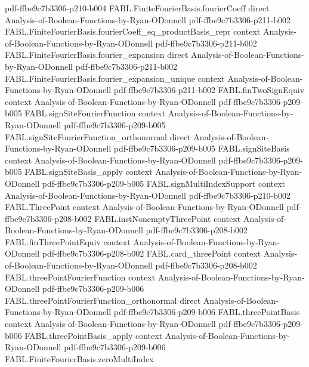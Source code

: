 \begin{theorem}
  {pdf-ffbe9c7b3306-p210-b004}
\proofstep
  {FABL.FiniteFourierBasis.fourierCoeff}
  {direct}
  {Analysis-of-Boolean-Functions-by-Ryan-ODonnell}
  {pdf-ffbe9c7b3306-p211-b002}
\proofstep
  {FABL.FiniteFourierBasis.fourierCoeff_eq_productBasis_repr}
  {context}
  {Analysis-of-Boolean-Functions-by-Ryan-ODonnell}
  {pdf-ffbe9c7b3306-p211-b002}
\proofstep
  {FABL.FiniteFourierBasis.fourier_expansion}
  {direct}
  {Analysis-of-Boolean-Functions-by-Ryan-ODonnell}
  {pdf-ffbe9c7b3306-p211-b002}
\proofstep
  {FABL.FiniteFourierBasis.fourier_expansion_unique}
  {context}
  {Analysis-of-Boolean-Functions-by-Ryan-ODonnell}
  {pdf-ffbe9c7b3306-p211-b002}
\proofstep
  {FABL.finTwoSignEquiv}
  {context}
  {Analysis-of-Boolean-Functions-by-Ryan-ODonnell}
  {pdf-ffbe9c7b3306-p209-b005}
\proofstep
  {FABL.signSiteFourierFunction}
  {context}
  {Analysis-of-Boolean-Functions-by-Ryan-ODonnell}
  {pdf-ffbe9c7b3306-p209-b005}
\proofstep
  {FABL.signSiteFourierFunction_orthonormal}
  {direct}
  {Analysis-of-Boolean-Functions-by-Ryan-ODonnell}
  {pdf-ffbe9c7b3306-p209-b005}
\proofstep
  {FABL.signSiteBasis}
  {context}
  {Analysis-of-Boolean-Functions-by-Ryan-ODonnell}
  {pdf-ffbe9c7b3306-p209-b005}
\proofstep
  {FABL.signSiteBasis_apply}
  {context}
  {Analysis-of-Boolean-Functions-by-Ryan-ODonnell}
  {pdf-ffbe9c7b3306-p209-b005}
\proofstep
  {FABL.signMultiIndexSupport}
  {context}
  {Analysis-of-Boolean-Functions-by-Ryan-ODonnell}
  {pdf-ffbe9c7b3306-p210-b002}
\proofstep
  {FABL.ThreePoint}
  {context}
  {Analysis-of-Boolean-Functions-by-Ryan-ODonnell}
  {pdf-ffbe9c7b3306-p208-b002}
\proofstep
  {FABL.instNonemptyThreePoint}
  {context}
  {Analysis-of-Boolean-Functions-by-Ryan-ODonnell}
  {pdf-ffbe9c7b3306-p208-b002}
\proofstep
  {FABL.finThreePointEquiv}
  {context}
  {Analysis-of-Boolean-Functions-by-Ryan-ODonnell}
  {pdf-ffbe9c7b3306-p208-b002}
\proofstep
  {FABL.card_threePoint}
  {context}
  {Analysis-of-Boolean-Functions-by-Ryan-ODonnell}
  {pdf-ffbe9c7b3306-p208-b002}
\proofstep
  {FABL.threePointFourierFunction}
  {context}
  {Analysis-of-Boolean-Functions-by-Ryan-ODonnell}
  {pdf-ffbe9c7b3306-p209-b006}
\proofstep
  {FABL.threePointFourierFunction_orthonormal}
  {direct}
  {Analysis-of-Boolean-Functions-by-Ryan-ODonnell}
  {pdf-ffbe9c7b3306-p209-b006}
\proofstep
  {FABL.threePointBasis}
  {context}
  {Analysis-of-Boolean-Functions-by-Ryan-ODonnell}
  {pdf-ffbe9c7b3306-p209-b006}
\proofstep
  {FABL.threePointBasis_apply}
  {context}
  {Analysis-of-Boolean-Functions-by-Ryan-ODonnell}
  {pdf-ffbe9c7b3306-p209-b006}
\proofstep
  {FABL.FiniteFourierBasis.zeroMultiIndex}

\end{theorem}

